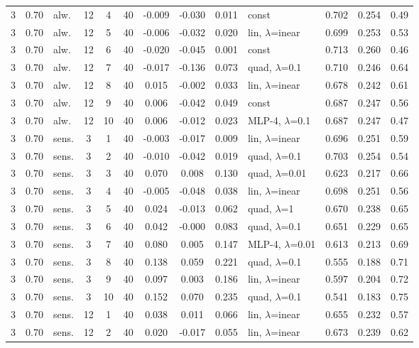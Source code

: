 \begin{scriptsize}
\begin{longtable}{cclcc c ccc l ccc}
3 & 0.70 & alw. & 12 & 4 & 40 & -0.009 & -0.030 & 0.011 & const & 0.702 & 0.254 & 0.49 \\
3 & 0.70 & alw. & 12 & 5 & 40 & -0.006 & -0.032 & 0.020 & lin, $\lambda$=inear & 0.699 & 0.253 & 0.53 \\
3 & 0.70 & alw. & 12 & 6 & 40 & -0.020 & -0.045 & 0.001 & const & 0.713 & 0.260 & 0.46 \\
3 & 0.70 & alw. & 12 & 7 & 40 & -0.017 & -0.136 & 0.073 & quad, $\lambda$=0.1 & 0.710 & 0.246 & 0.64 \\
3 & 0.70 & alw. & 12 & 8 & 40 & 0.015 & -0.002 & 0.033 & lin, $\lambda$=inear & 0.678 & 0.242 & 0.61 \\
3 & 0.70 & alw. & 12 & 9 & 40 & 0.006 & -0.042 & 0.049 & const & 0.687 & 0.247 & 0.56 \\
3 & 0.70 & alw. & 12 & 10 & 40 & 0.006 & -0.012 & 0.023 & MLP-4, $\lambda$=0.1 & 0.687 & 0.247 & 0.47 \\
3 & 0.70 & sens. & 3 & 1 & 40 & -0.003 & -0.017 & 0.009 & lin, $\lambda$=inear & 0.696 & 0.251 & 0.59 \\
3 & 0.70 & sens. & 3 & 2 & 40 & -0.010 & -0.042 & 0.019 & quad, $\lambda$=0.1 & 0.703 & 0.254 & 0.54 \\
3 & 0.70 & sens. & 3 & 3 & 40 & 0.070 & 0.008 & 0.130 & quad, $\lambda$=0.01 & 0.623 & 0.217 & 0.66 \\
3 & 0.70 & sens. & 3 & 4 & 40 & -0.005 & -0.048 & 0.038 & lin, $\lambda$=inear & 0.698 & 0.251 & 0.56 \\
3 & 0.70 & sens. & 3 & 5 & 40 & 0.024 & -0.013 & 0.062 & quad, $\lambda$=1 & 0.670 & 0.238 & 0.65 \\
3 & 0.70 & sens. & 3 & 6 & 40 & 0.042 & -0.000 & 0.083 & quad, $\lambda$=0.1 & 0.651 & 0.229 & 0.65 \\
3 & 0.70 & sens. & 3 & 7 & 40 & 0.080 & 0.005 & 0.147 & MLP-4, $\lambda$=0.01 & 0.613 & 0.213 & 0.69 \\
3 & 0.70 & sens. & 3 & 8 & 40 & 0.138 & 0.059 & 0.221 & quad, $\lambda$=0.1 & 0.555 & 0.188 & 0.71 \\
3 & 0.70 & sens. & 3 & 9 & 40 & 0.097 & 0.003 & 0.186 & lin, $\lambda$=inear & 0.597 & 0.204 & 0.72 \\
3 & 0.70 & sens. & 3 & 10 & 40 & 0.152 & 0.070 & 0.235 & quad, $\lambda$=0.1 & 0.541 & 0.183 & 0.75 \\
3 & 0.70 & sens. & 12 & 1 & 40 & 0.038 & 0.011 & 0.066 & lin, $\lambda$=inear & 0.655 & 0.232 & 0.57 \\
3 & 0.70 & sens. & 12 & 2 & 40 & 0.020 & -0.017 & 0.055 & lin, $\lambda$=inear & 0.673 & 0.239 & 0.62 \\

\end{longtable}
\end{scriptsize}
